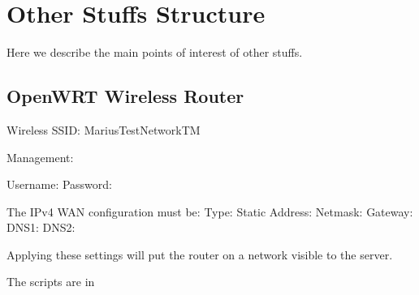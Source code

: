 \chapter{Other Stuffs Structure}\label{app:stuff_structure}
Here we describe the main points of interest of other stuffs.

\section{OpenWRT Wireless Router}
Wireless SSID: MariusTestNetworkTM

Management:

Username: 
Password: 

The IPv4 WAN configuration must be:
Type: Static
Address: 
Netmask: 
Gateway: 
DNS1: 
DNS2: 

Applying these settings will put the router on a network visible to the server.

The scripts are in 